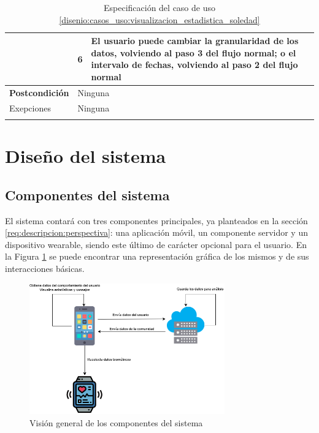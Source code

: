 \begin{table}[h]
\begin{tabularx}{\textwidth}{|l|l|X|}
                    \cline{2-3} & 6 & El usuario puede cambiar la granularidad de los datos, volviendo al paso 3 del flujo normal; o el intervalo de fechas, volviendo al paso 2 del flujo normal \\
                    \hline
                    \textbf{Postcondición} & \multicolumn{2}{|X|}{Ninguna} \\
                    \hline
                    Exepciones & \multicolumn{2}{|X|}{Ninguna} \\
                    \hline
                    \caption{Especificación del caso de uso \ref{disenio:casos_uso:visualizacion_estadistica_soledad}}
                    \label{tabla:casos_uso:visualizacion_estadistica_soledad}
                \end{tabularx}
            \end{table}
            
            \clearpage  %
            
    
    \section{Diseño del sistema}
    
        \subsection{Componentes del sistema}

            El sistema contará con tres componentes principales, ya planteados en la sección \ref{req:descripcion:perspectiva}: una aplicación móvil, un componente servidor y un dispositivo \gls{wearable}, siendo este último de carácter opcional para el usuario. En la Figura \ref{figure:diseno:componentes} se puede encontrar una representación gráfica de los mismos y de sus interacciones básicas.
            
            \begin{figure}[h]
                \centering
                \includegraphics[width=0.75\textwidth]{figures/diseno/Componentes.png}
                \caption{Visión general de los componentes del sistema}
                \label{figure:diseno:componentes}
            \end{figure}
            
